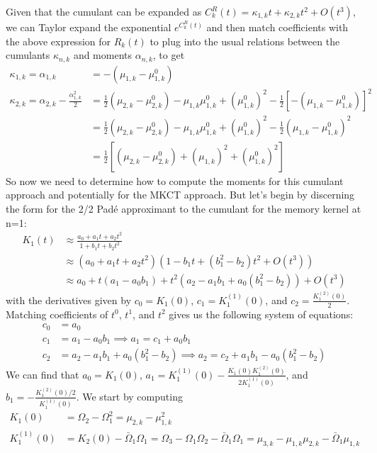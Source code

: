 Given that the cumulant can be expanded as $C_k^R(t) = \kappa_{1,k} t + \kappa_{2,k} t^2 + O(t^3)$, we can Taylor expand the exponential $e^{C_k^R(t)}$ and then match coefficients with the above expression for $R_k(t)$ to plug into the usual relations between the cumulants $\kappa _{n,k}$ and moments $\alpha_{n,k}$, to get
\begin{align}
    \kappa_{1,k} = \alpha_{1,k} &= -\left(\mu_{1,k}-\mu_{1,k}^0\right)\\
    \kappa_{2,k} = \alpha_{2,k} - \frac{\alpha_{1,k}^2}{2} &= \frac{1}{2}\left(\mu_{2,k}-\mu_{2,k}^0\right)-\mu_{1,k}\mu_{1,k}^0+\left(\mu_{1,k}^0\right)^2 -\frac{1}{2}{\left[-\left(\mu_{1,k}-\mu_{1,k}^0\right)\right]^2}\\
&= \frac{1}{2}\left(\mu_{2,k}-\mu_{2,k}^0\right)-\mu_{1,k}\mu_{1,k}^0+\left(\mu_{1,k}^0\right)^2 -\frac{1}{2}\left(\mu_{1,k}-\mu_{1,k}^0\right)^2\\
&= \frac{1}{2}\left[\left( \mu_{2,k} - \mu_{2,k}^0 \right) +\left( \mu_{1,k} \right)^2 + \left( \mu_{1,k}^0 \right)^2 \right]
\end{align}
So now we need to determine how to compute the moments for this cumulant approach and potentially for the MKCT approach. But let's begin by discerning the form for the 2/2 Padé approximant to the cumulant for the memory kernel at n=1:
\begin{align}
    K_1(t) &\approx \frac{a_0 + a_1 t+ a_2 t^2}{1 + b_1 t + b_2 t^2}\\
& \approx \left(a_0 + a_1 t+ a_2 t^2\right)\left(1 - b_1 t + \left(b_1^2 - b_2\right) t^2 + O(t^3)\right) \\
& \approx a_0 + t\left(a_1 - a_0 b_1\right) + t^2\left(a_2 - a_1 b_1 + a_0\left(b_1^2 - b_2\right)\right) + O(t^3)
\end{align}
with the derivatives given by $c_0 = K_1(0)$, $c_1 = K_1^{(1)}(0)$, and $c_2 = \frac{K_1^{(2)}(0)}{2}$. Matching coefficients of $t^0$, $t^1$, and $t^2$ gives us the following system of equations:
\begin{align}
    c_0 &= a_0 \\
    c_1 &= a_1 - a_0 b_1 \implies a_1 = c_1 + a_0 b_1\\
    c_2 &= a_2 - a_1 b_1 + a_0\left(b_1^2 - b_2\right) \implies a_2 = c_2 + a_1 b_1 - a_0\left(b_1^2 - b_2\right)
\end{align}
We can find that $a_0 = K_1(0)$, $a_1 = K_1^{(1)}(0) - \frac{K_1(0) K_1^{(2)}(0)}{2 K_1^{(1)}(0)}$, and $b_1 = -\frac{K_1^{(2)}(0) / 2}{K_1^{(1)}(0)}$. We start by computing
\begin{align}
    K_1(0) &= \Omega_2 - \Omega_1^2 = \mu_{2,k} - \mu_{1,k}^2\\
    K_1^{(1)}(0) &= K_2(0) - \bar{\Omega}_1 \Omega_1 = \Omega_3 - \Omega_1 \Omega_2 - \bar{\Omega}_1 \Omega_1 = \mu_{3,k} - \mu_{1,k} \mu_{2,k} - \bar{\Omega}_1 \mu_{1,k}\\
\end{align}

